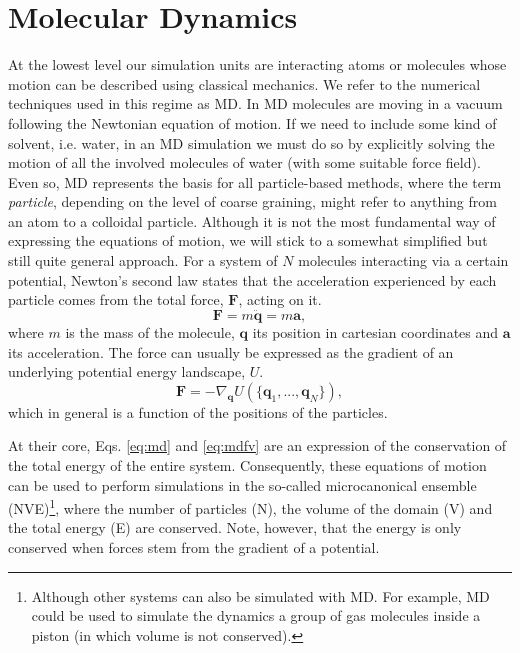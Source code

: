 \documentclass[twoside,openright,titlepage,numbers=noenddot,%
headinclude,footinclude,cleardoublepage=empty,abstract=on,
BCOR=5mm,fontsize=11pt, dvipsnames, paper=b5
]{scrreprt}
\renewcommand{\vec}[1]{\bm{#1}}
\newcommand{\ppos}{q}
\begin{document}
\chapter{Molecular Dynamics}\label{sec:md}

At the lowest level our simulation units are interacting atoms or molecules whose motion can be described using classical mechanics. We refer to the numerical techniques used in this regime as \gls{MD}.
In \gls{MD} molecules are moving in a vacuum following the Newtonian equation of motion. If we need to include some kind of solvent, i.e. water, in an \gls{MD} simulation we must do so by explicitly solving the motion of all the involved molecules of water (with some suitable force field).
Even so, \gls{MD} represents the basis for all particle-based methods, where the term \emph{particle}, depending on the level of coarse graining, might refer to anything from an atom to a colloidal particle.
Although it is not the most fundamental way of expressing the equations of motion, we will stick to a somewhat simplified but still quite general approach. For a system of $N$ molecules interacting via a certain potential, Newton's second law states that the acceleration experienced by each particle comes from the total force, $\vec{F}$, acting on it.
\begin{equation}
  \label{eq:md}
  \vec{F} =  m\ddot{\vec{\ppos}} = m\vec{a},
\end{equation}
where $m$ is the mass of the molecule, $\vec{\ppos}$ its position in cartesian coordinates and $\vec{a}$ its acceleration.
The force can usually be expressed as the gradient of an underlying potential energy landscape, $U$.
\begin{equation}
  \label{eq:mdfv}
  \vec{F} = -\nabla_{\vec{\ppos}} U(\{\vec{\ppos}_1,...,\vec{\ppos}_N\}),
\end{equation}
which in general is a function of the positions of the particles.


At their core, Eqs. \eqref{eq:md} and \eqref{eq:mdfv} are an expression of the conservation of the total energy of the entire system. Consequently, these equations of motion can be used to perform simulations in the so-called microcanonical ensemble (NVE)\footnote{Although other systems can also be simulated with \gls{MD}. For example, \gls{MD} could be used to simulate the dynamics a group of gas molecules inside a piston (in which volume is not conserved).}, where the number of particles (N), the volume of the domain (V) and the total energy (E) are conserved. Note, however, that the energy is only conserved when forces stem from the gradient of a potential.
\end{document}
